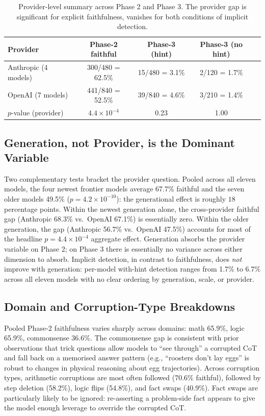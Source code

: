 \documentclass{article}
\begin{document}
\begin{table}[h]
\centering
\caption{Provider-level summary across Phase 2 and Phase 3. The provider gap is significant for explicit faithfulness, vanishes for both conditions of implicit detection.}
\label{tab:provider}
\vspace{0.5em}
\begin{tabular}{@{}lcccc@{}}
\toprule
Provider & Phase-2 faithful & Phase-3 (hint) & Phase-3 (no hint) \\
\midrule
Anthropic (4 models)  & 300/480 = 62.5\%   & 15/480 = 3.1\%   & 2/120 = 1.7\% \\
OpenAI (7 models)     & 441/840 = 52.5\%   & 39/840 = 4.6\%   & 3/210 = 1.4\% \\
\midrule
$p$-value (provider) & $4.4\!\times\!10^{-4}$ & 0.23 & 1.00 \\
\bottomrule
\end{tabular}
\end{table}

\subsection{Generation, not Provider, is the Dominant Variable}

Two complementary tests bracket the provider question. Pooled across all eleven models, the four newest frontier models average 67.7\% faithful and the seven older models 49.5\% ($p=4.2\!\times\!10^{-10}$): the generational effect is roughly $18$ percentage points. Within the newest generation alone, the cross-provider faithful gap (Anthropic 68.3\% vs.\ OpenAI 67.1\%) is essentially zero. Within the older generation, the gap (Anthropic 56.7\% vs.\ OpenAI 47.5\%) accounts for most of the headline $p=4.4\!\times\!10^{-4}$ aggregate effect. Generation absorbs the provider variable on Phase 2; on Phase 3 there is essentially no variance across either dimension to absorb. Implicit detection, in contrast to faithfulness, does \emph{not} improve with generation: per-model with-hint detection ranges from 1.7\% to 6.7\% across all eleven models with no clear ordering by generation, scale, or provider.

\subsection{Domain and Corruption-Type Breakdowns}

Pooled Phase-2 faithfulness varies sharply across domains: math 65.9\%, logic 65.9\%, commonsense 36.6\%. The commonsense gap is consistent with prior observations \citep{turpin2023language} that trick questions allow models to ``see through'' a corrupted CoT and fall back on a memorised answer pattern (e.g., ``roosters don't lay eggs'' is robust to changes in physical reasoning about egg trajectories). Across corruption types, arithmetic corruptions are most often followed (70.6\% faithful), followed by step deletion (58.2\%), logic flips (54.8\%), and fact swaps (40.9\%). Fact swaps are particularly likely to be ignored: re-asserting a problem-side fact appears to give the model enough leverage to override the corrupted CoT.
\end{document}
